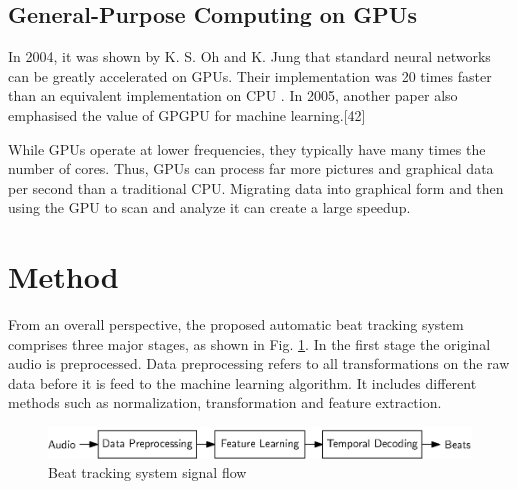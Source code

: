 \documentclass{scrartcl}
\begin{document}
\subsection{General-Purpose Computing on GPUs} 

In 2004, it was shown by K. S. Oh and K. Jung that standard neural networks can be greatly accelerated on GPUs. Their implementation was 20 times faster than an equivalent implementation on CPU \cite{Oh2004}. In 2005, another paper also emphasised the value of GPGPU for machine learning.[42]


While GPUs operate at lower frequencies, they typically have many times the number of cores. Thus, GPUs can process far more pictures and graphical data per second than a traditional CPU. Migrating data into graphical form and then using the GPU to scan and analyze it can create a large speedup.


\newpage


\section{Method}

From an overall perspective, the proposed automatic beat tracking system comprises three major stages, as shown in Fig. \ref{fig:system}. In the first stage the original audio is preprocessed. Data preprocessing refers to all transformations on the raw data before it is feed to the machine learning algorithm. It includes different methods such as normalization, transformation and feature extraction. 

\begin{figure}[htbp]
\centering
\includegraphics[scale=1.0]{figures/beat_tracking_system.eps}
\caption{Beat tracking system signal flow}
\label{fig:system}
\end{figure}  
\end{document}
